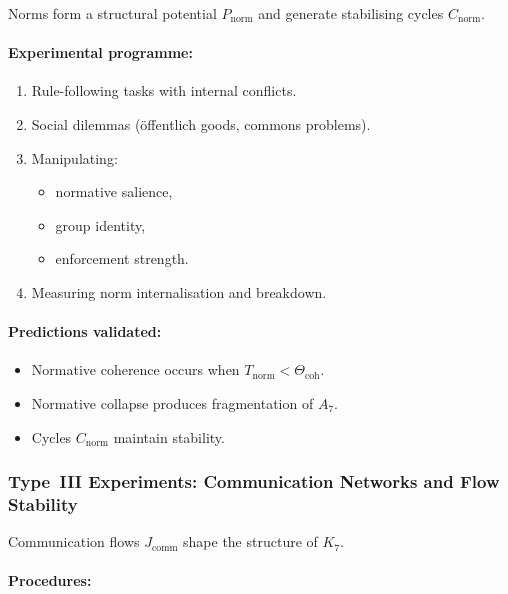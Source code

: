 Norms form a structural potential $P_{\mathrm{norm}}$ and 
generate stabilising cycles $C_{\mathrm{norm}}$.

\paragraph{Experimental programme:}

\begin{enumerate}
    \item Rule-following tasks with internal conflicts.
    \item Social dilemmas (öffentlich goods, commons problems).
    \item Manipulating:
          \begin{itemize}
              \item normative salience,
              \item group identity,
              \item enforcement strength.
          \end{itemize}
    \item Measuring norm internalisation and breakdown.
\end{enumerate}

\paragraph{Predictions validated:}

\begin{itemize}
    \item Normative coherence occurs when 
          $T_{\mathrm{norm}} < \Theta_{\mathrm{coh}}$.
    \item Normative collapse produces fragmentation of $A_7$.
    \item Cycles $C_{\mathrm{norm}}$ maintain stability.
\end{itemize}



\subsubsection{Type~III Experiments: Communication Networks and Flow Stability}

Communication flows $J_{\mathrm{comm}}$ shape the structure of $K_7$.

\paragraph{Procedures:}

